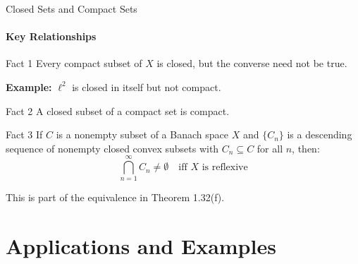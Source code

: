 \documentclass[aspectratio=169,10pt]{beamer}
\theoremstyle{definition}
\begin{document}
\begin{frame}{Closed Sets and Compact Sets}
\framesubtitle{Key Relationships}

\begin{block}{Fact 1}
Every compact subset of $X$ is closed, but the converse need not be true.

\textbf{Example:} $\ell^2$ is closed in itself but not compact.
\end{block}

\vspace{0.3cm}

\begin{block}{Fact 2}
A closed subset of a compact set is compact.
\end{block}

\vspace{0.3cm}

\begin{block}{Fact 3}
If $C$ is a nonempty subset of a Banach space $X$ and $\{C_n\}$ is a descending sequence of nonempty closed convex subsets with $C_n \subseteq C$ for all $n$, then:
\begin{equation*}
\bigcap_{n=1}^{\infty} C_n \neq \emptyset \quad \text{iff } X \text{ is reflexive}
\end{equation*}
\end{block}

\vspace{0.3cm}

This is part of the equivalence in Theorem 1.32(f).
\end{frame}

\section{Applications and Examples}
\end{document}
